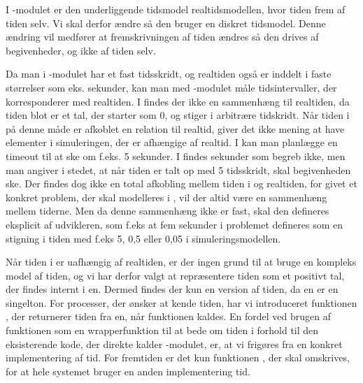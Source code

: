 I -modulet er den underliggende  tidsmodel realtidsmodellen, hvor tiden frem af tiden selv. Vi skal derfor ændre \pycsp så den bruger en diskret tidsmodel.
Denne ændring vil medfører at fremskrivningen af tiden ændres så den  drives af begivenheder, og ikke af tiden selv.
 
Da man i -modulet har et fast tidsskridt, og
realtiden også er inddelt i faste størrelser
som eks. sekunder, kan man med -modulet måle tidsintervaller, der
korresponderer med realtiden. I \des findes der ikke en
sammenhæng til  realtiden, da tiden blot er et tal, der starter som 0, og stiger
i arbitrære tidskridt. Når tiden i \des på denne måde er afkoblet
en relation til realtid, giver det ikke mening at have elementer i simuleringen, der er afhængige af realtid. 
I \pycsp kan man planlægge en timeout til at ske om f.eks. 5 sekunder. I \des findes sekunder som
begreb ikke, men man  angiver i stedet, at når tiden er talt op med 5 tidsskridt, skal
begivenheden ske. Der findes dog ikke en total afkobling mellem tiden i \des og realtiden, for givet et konkret problem, der skal modelleres i \des, vil der altid være en sammenhæng mellem tiderne. Men da denne sammenhæng ikke er fast, skal den defineres eksplicit af udvikleren, som f.eks at fem sekunder i problemet defineres som en stigning i tiden med f.eks 5, 0,5 eller 0,05 i simuleringsmodellen.

Når tiden i \des er uafhængig af realtiden, er der ingen grund til at bruge en kompleks model af tiden, og vi har derfor valgt at repræsentere tiden som et positivt tal, der findes internt i \sched en. Dermed findes der kun en version af tiden, da  \sched en er en singelton. For processer, der ønsker at kende tiden, har vi
introduceret funktionen , der returnerer tiden fra \sched en, når funktionen kaldes. En fordel ved brugen af funktionen  som en wrapperfunktion til at bede om tiden i forhold til den eksisterende kode, der direkte kalder -modulet, er, at vi frigøres fra en konkret implementering af tid. For fremtiden er det kun funktionen , der skal omskrives, for at hele systemet bruger en anden implementering tid.

